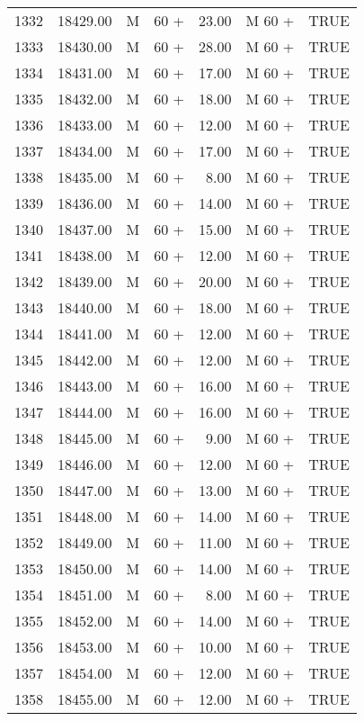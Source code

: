 \begin{table}[ht]
\begin{tabular}{rrllrll}
  1332 & 18429.00 & M & 60 + & 23.00 & M 60 + & TRUE \\ 
  1333 & 18430.00 & M & 60 + & 28.00 & M 60 + & TRUE \\ 
  1334 & 18431.00 & M & 60 + & 17.00 & M 60 + & TRUE \\ 
  1335 & 18432.00 & M & 60 + & 18.00 & M 60 + & TRUE \\ 
  1336 & 18433.00 & M & 60 + & 12.00 & M 60 + & TRUE \\ 
  1337 & 18434.00 & M & 60 + & 17.00 & M 60 + & TRUE \\ 
  1338 & 18435.00 & M & 60 + & 8.00 & M 60 + & TRUE \\ 
  1339 & 18436.00 & M & 60 + & 14.00 & M 60 + & TRUE \\ 
  1340 & 18437.00 & M & 60 + & 15.00 & M 60 + & TRUE \\ 
  1341 & 18438.00 & M & 60 + & 12.00 & M 60 + & TRUE \\ 
  1342 & 18439.00 & M & 60 + & 20.00 & M 60 + & TRUE \\ 
  1343 & 18440.00 & M & 60 + & 18.00 & M 60 + & TRUE \\ 
  1344 & 18441.00 & M & 60 + & 12.00 & M 60 + & TRUE \\ 
  1345 & 18442.00 & M & 60 + & 12.00 & M 60 + & TRUE \\ 
  1346 & 18443.00 & M & 60 + & 16.00 & M 60 + & TRUE \\ 
  1347 & 18444.00 & M & 60 + & 16.00 & M 60 + & TRUE \\ 
  1348 & 18445.00 & M & 60 + & 9.00 & M 60 + & TRUE \\ 
  1349 & 18446.00 & M & 60 + & 12.00 & M 60 + & TRUE \\ 
  1350 & 18447.00 & M & 60 + & 13.00 & M 60 + & TRUE \\ 
  1351 & 18448.00 & M & 60 + & 14.00 & M 60 + & TRUE \\ 
  1352 & 18449.00 & M & 60 + & 11.00 & M 60 + & TRUE \\ 
  1353 & 18450.00 & M & 60 + & 14.00 & M 60 + & TRUE \\ 
  1354 & 18451.00 & M & 60 + & 8.00 & M 60 + & TRUE \\ 
  1355 & 18452.00 & M & 60 + & 14.00 & M 60 + & TRUE \\ 
  1356 & 18453.00 & M & 60 + & 10.00 & M 60 + & TRUE \\ 
  1357 & 18454.00 & M & 60 + & 12.00 & M 60 + & TRUE \\ 
  1358 & 18455.00 & M & 60 + & 12.00 & M 60 + & TRUE \\ 

\end{tabular}
\end{table}
